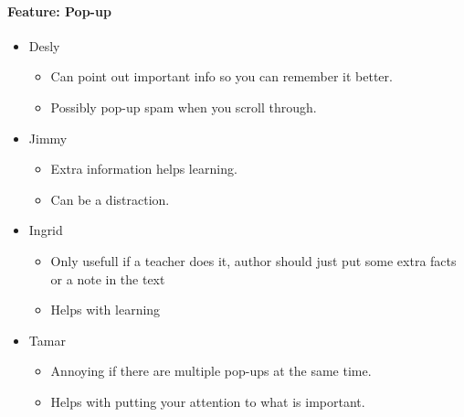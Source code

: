 \documentclass[main.tex]{subfiles}
\begin{document}
\paragraph{Feature: Pop-up}
\begin{itemize}
	\item Desly
		\begin{itemize}
			\item Can point out important info so you can remember it better.
			\item Possibly pop-up spam when you scroll through.
		\end{itemize}
	\item Jimmy
		\begin{itemize}
			\item Extra information helps learning.
			\item Can be a distraction.
		\end{itemize}
	\item Ingrid
		\begin{itemize}
			\item Only usefull if a teacher does it, author should just put some extra facts or a note in the text
			\item Helps with learning
		\end{itemize}
	\item Tamar
		\begin{itemize}
			\item Annoying if there are multiple pop-ups at the same time.
			\item Helps with putting your attention to what is important.
		\end{itemize}

\end{itemize}
\end{document}
